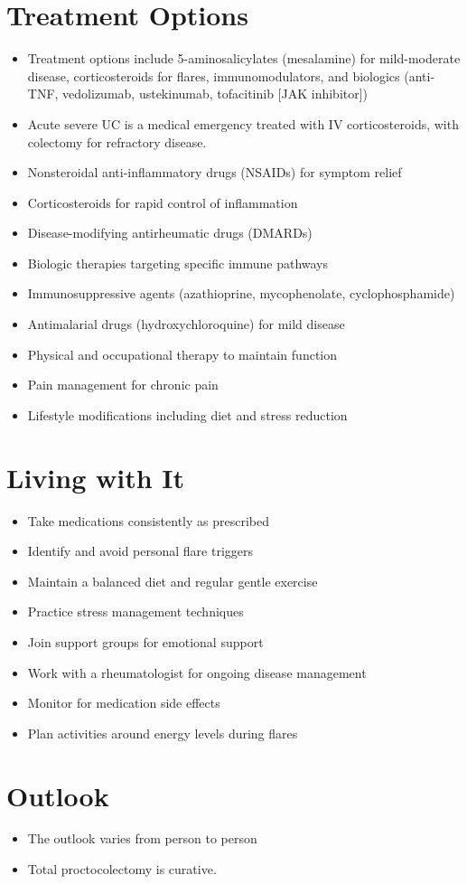 \section{Treatment Options}
\begin{itemize}[noitemsep]
  \item Treatment options include 5-aminosalicylates (mesalamine) for mild-moderate disease, corticosteroids for flares, immunomodulators, and biologics (anti-TNF, vedolizumab, ustekinumab, tofacitinib [JAK inhibitor])
  \item Acute severe UC is a medical emergency treated with IV corticosteroids, with colectomy for refractory disease.
  \item Nonsteroidal anti-inflammatory drugs (NSAIDs) for symptom relief
  \item Corticosteroids for rapid control of inflammation
  \item Disease-modifying antirheumatic drugs (DMARDs)
  \item Biologic therapies targeting specific immune pathways
  \item Immunosuppressive agents (azathioprine, mycophenolate, cyclophosphamide)
  \item Antimalarial drugs (hydroxychloroquine) for mild disease
  \item Physical and occupational therapy to maintain function
  \item Pain management for chronic pain
  \item Lifestyle modifications including diet and stress reduction
\end{itemize}
\section{Living with It}
\begin{itemize}[noitemsep]
  \item Take medications consistently as prescribed
  \item Identify and avoid personal flare triggers
  \item Maintain a balanced diet and regular gentle exercise
  \item Practice stress management techniques
  \item Join support groups for emotional support
  \item Work with a rheumatologist for ongoing disease management
  \item Monitor for medication side effects
  \item Plan activities around energy levels during flares
\end{itemize}
\section{Outlook}
\begin{itemize}[noitemsep]
  \item The outlook varies from person to person
  \item Total proctocolectomy is curative.
\end{itemize}

